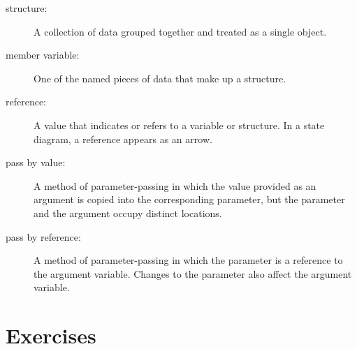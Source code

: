 \begin{description}
	
	\item[structure:]  A collection of data grouped together and
	treated as a single object.
	
	\item[member variable:]  One of the named pieces of data that make up
	a structure.
	
	\item[reference:]  A value that indicates or refers to a variable
	or structure.  In a state diagram, a reference appears as an arrow.
	
	\item[pass by value:]  A method of parameter-passing in which the
	value provided as an argument is copied into the corresponding
	parameter, but the parameter and the argument occupy distinct
	locations.
	
	\item[pass by reference:]  A method of parameter-passing in which
	the parameter is a reference to the argument variable.  Changes
	to the parameter also affect the argument variable.
	
	
\end{description}

\section{Exercises}
\setcounter{exercisenum}{0}




